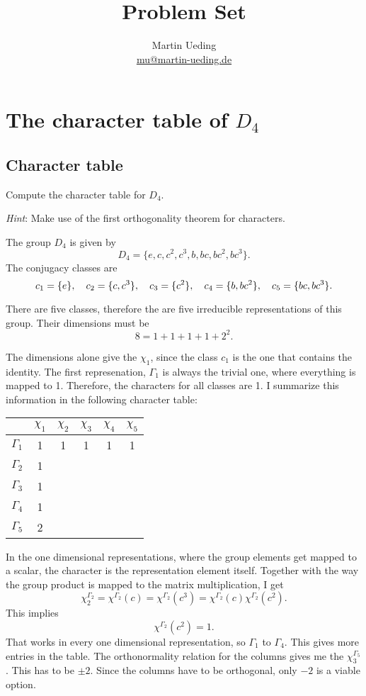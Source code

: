 \documentclass[11pt, english, fleqn, DIV=15, headinclude, BCOR=1cm]{scrartcl}
\title{Problem Set \arabic{problemset}}
\author{
    Martin Ueding \\ \small{\href{mailto:mu@martin-ueding.de}{mu@martin-ueding.de}}
}
\begin{document}
\maketitle

\section{The character table of $D_4$}

\subsection{Character table}

\begin{problem}
    Compute the character table for $D_4$.

    \emph{Hint}: Make use of the first orthogonality theorem for characters.
\end{problem}

The group $D_4$ is given by
\[
    D_4 = \{ e, c, c^2, c^3, b, bc, bc^2, bc^3 \}.
\]
The conjugacy classes are
\[
    c_1 = \{ e \}
    ,\quad
    c_2 = \{ c, c^3 \}
    ,\quad
    c_3 = \{ c^2 \}
    ,\quad
    c_4 = \{ b, bc^2 \}
    ,\quad
    c_5 = \{ bc, bc^3 \}.
\]

There are five classes, therefore the are five irreducible representations of
this group. Their dimensions must be
\[
    8 = 1 + 1 + 1 + 1 + 2^2.
\]

The dimensions alone give the $\chi_1$, since the class $c_1$ is the one that
contains the identity. The first represenation, $\Gamma_1$ is always the
trivial one, where everything is mapped to 1. Therefore, the characters for all
classes are 1. I summarize this information in the following character table:

\begin{tabular}{c|ccccc}
    & $\chi_1$ & $\chi_2$ & $\chi_3$ & $\chi_4$ & $\chi_5$ \\
    \midrule
    $\Gamma_1$ & 1 & 1 & 1 & 1 & 1 \\
    $\Gamma_2$ & 1 & & & & \\
    $\Gamma_3$ & 1 & & & & \\
    $\Gamma_4$ & 1 & & & & \\
    $\Gamma_5$ & 2 & & & & \\
\end{tabular}

In the one dimensional representations, where the group elements get mapped to
a scalar, the character is the representation element itself. Together with the
way the group product is mapped to the matrix multiplication, I get
\[
    \chi_2^{\Gamma_2}
    = \chi^{\Gamma_2}(c)
    = \chi^{\Gamma_2}(c^3)
    = \chi^{\Gamma_2}(c) \chi^{\Gamma_2}(c^2).
\]
This implies
\[
    \chi^{\Gamma_2}(c^2) = 1.
\]
That works in every one dimensional representation, so $\Gamma_1$ to
$\Gamma_4$. This gives more entries in the table. The orthonormality relation
for the columns gives me the $\chi_3^{\Gamma_5}$. This has to be $\pm 2$. Since
the columns have to be orthogonal, only $-2$ is a viable option.
\end{document}
